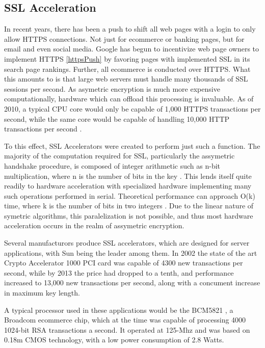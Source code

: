 \documentclass[journal]{IEEEtran}
\begin{document}
\subsection{SSL Acceleration}

In recent years, there has been a push to shift all web pages with a login to only allow HTTPS connections.  Not just for ecommerce or banking pages, but for email and even social media.  Google has begun to incentivize web page owners to implement HTTPS \ref{httpsPush} by favoring pages with implemented SSL in its search page rankings.  Further, all ecommerce is conducted over HTTPS.  What this amounts to is that large web servers must handle many thousands of SSL sessions per second.  As asymetric encryption is much more expensive computationally, hardware which can offload this processing is invaluable.  As of 2010, a typical CPU core would only be capable of 1,000 HTTPS transactions per second, while the same core would be capable of handling 10,000 HTTP transactions per second \cite{sslGPU}.

To this effect, SSL Accelerators were created to perform just such a function.  The majority of the computation required for SSL, particularly the assymetric handshake procedure, is composed of integer arithmetic such as n-bit multiplication, where n is the number of bits in the key \cite{sslGPU}.  This lends itself quite readily to hardware acceleration with specialized hardware implementing many such operations performed in serial.  Theoretical performance can approach O(k) time, where k is the number of bits in two integers \cite{sslGPU}.  Due to the linear nature of symetric algorithms, this paralelization is not possible, and thus most hardware acceleration occurs in the realm of assymetric encryption.

Several manufacturors produce SSL accelerators, which are designed for server applications, with Sun being the leader among them.  In 2002 the state of the art Crypto Accelerator 1000 PCI card was capable of 4300 new transactions per second, while by 2013 the price had dropped to a tenth, and performance increased to 13,000 new transactions per second, along with a concument increase in maximum key length.

A typical processor used in these applications would be the BCM5821 \cite{broadcom}, a Broadcom ecommerce chip, which at the time was capable of processing 4000 1024-bit RSA transactions a second.  It operated at 125-Mhz and was based on 0.18m CMOS technology, with a low power consumption of 2.8 Watts.
\end{document}
